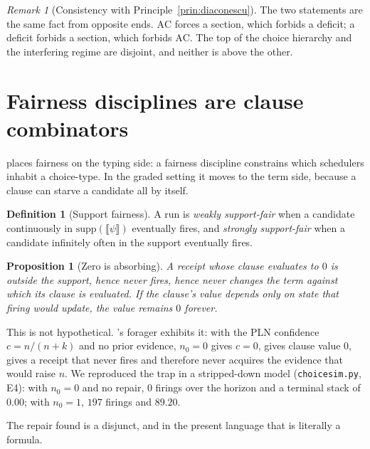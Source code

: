 \documentclass[11pt]{article}
\theoremstyle{definition}
\newtheorem{definition}{Definition}
\theoremstyle{plain}
\newtheorem{proposition}{Proposition}
\theoremstyle{remark}
\newtheorem{remark}{Remark}
\newcommand{\sem}[1]{\llbracket #1 \rrbracket}
\newcommand{\AC}{\mathrm{AC}}
\begin{document}
\begin{remark}[Consistency with Principle~\ref{prin:diaconescu}]
The two statements are the same fact from opposite ends. $\AC$ forces a section, which
forbids a deficit; a deficit forbids a section, which forbids $\AC$. The
top of the choice hierarchy and the interfering regime are disjoint, and neither is
above the other.
\end{remark}

\section{Fairness disciplines are clause combinators}\label{sec:fairness}

\cite{choicesched} places fairness on the typing side: a fairness discipline constrains
which schedulers inhabit a choice-type. In the graded setting it moves to the term
side, because a clause can starve a candidate all by itself.

\begin{definition}[Support fairness]\label{def:supportfair}
A run is \emph{weakly support-fair} when a candidate continuously in
$\mathrm{supp}(\sem{\psi})$ eventually fires, and \emph{strongly support-fair} when a
candidate infinitely often in the support eventually fires.
\end{definition}

\begin{proposition}[Zero is absorbing]\label{prop:absorbing}
A receipt whose clause evaluates to $0$ is outside the support, hence never fires,
hence never changes the term against which its clause is evaluated. If the clause's
value depends only on state that firing would update, the value remains $0$ forever.
\end{proposition}

This is not hypothetical. \cite{gradedwhere}'s forager exhibits it: with the PLN
confidence $c = n/(n+k)$ and no prior evidence, $n_0 = 0$ gives $c = 0$, gives clause
value $0$, gives a receipt that never fires and therefore never acquires the evidence
that would raise $n$. We reproduced the trap in a stripped-down model
(\texttt{choicesim.py}, E4): with $n_0 = 0$ and no repair, $0$ firings over the
horizon and a terminal stack of $0.00$; with $n_0 = 1$, $197$ firings and $89.20$.

The repair \cite{gradedwhere} found is a disjunct, and in the present language that is
literally a formula.
\end{document}
